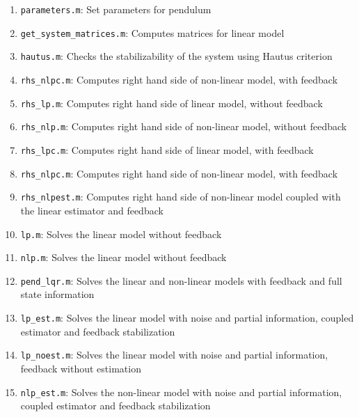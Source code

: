 \documentclass[12pt]{article}
\begin{document}
\begin{enumerate}

\item {\tt parameters.m}: Set parameters for pendulum

\item {\tt get\_system\_matrices.m}: Computes matrices for linear model

\item {\tt hautus.m}: Checks the stabilizability of the system using Hautus criterion
\item {\tt rhs\_nlpc.m}: Computes right hand side of non-linear model, with feedback
\item {\tt rhs\_lp.m}: Computes right hand side of linear model, without feedback

\item {\tt rhs\_nlp.m}: Computes right hand side of non-linear model, without feedback

\item {\tt rhs\_lpc.m}: Computes right hand side of linear model, with feedback

\item {\tt rhs\_nlpc.m}: Computes right hand side of non-linear model, with feedback

\item {\tt rhs\_nlpest.m}: Computes right hand side of non-linear model coupled with the linear estimator and feedback

\item {\tt lp.m}: Solves the linear model without feedback

\item {\tt nlp.m}: Solves the linear model without feedback

\item {\tt pend\_lqr.m}: Solves the linear and non-linear models with feedback and full state information

\item {\tt lp\_est.m}: Solves the linear model with noise and partial information, coupled estimator and feedback stabilization

\item {\tt lp\_noest.m}: Solves the linear model with noise and partial information, feedback without estimation

\item {\tt nlp\_est.m}: Solves the non-linear model with noise and partial information, coupled estimator and feedback stabilization

\end{enumerate}
\end{document}
